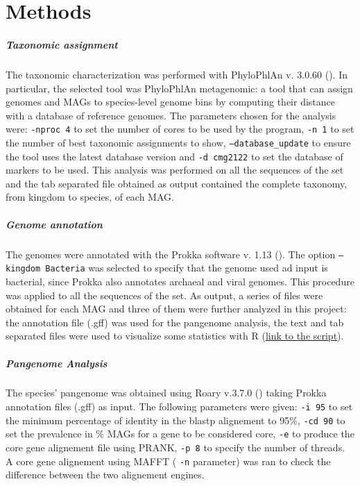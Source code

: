 \section*{Methods}




\nocite{Tange2011a}

\subparagraph*{Taxonomic assignment}

The taxonomic characterization was performed with PhyloPhlAn v. 3.0.60 (\cite{phylophlan}). In particular, the selected tool was PhyloPhlAn metagenomic: a tool that can assign genomes and MAGs to species-level genome bins by computing their distance with a database of reference genomes. The parameters chosen for the analysis were: \texttt{-nproc 4} to set the number of cores to be used by the program, \texttt{-n 1} to set the number of best taxonomic assignments to show, \texttt{--database\_update} to ensure the tool uses the latest database version and \texttt{-d cmg2122} to set the database of markers to be used. This analysis was performed on all the sequences of the set and the tab separated file obtained as output contained the complete taxonomy, from kingdom to species, of each MAG.

\subparagraph*{Genome annotation}

The genomes were annotated with the Prokka software v. 1.13 (\cite{prokka}). The option \texttt{--kingdom Bacteria} was selected to specify that the genome used ad input is bacterial, since Prokka also annotates archaeal and viral genomes. This procedure was applied to all the sequences of the set. As output, a series of files were obtained for each MAG and three of them were further analyzed in this project: the annotation file (.gff) was used for the pangenome analysis, the text and tab separated files were used to visualize some statistics with R (\href{https://github.com/enricofrigoli/cmg_project/blob/main/Rscript/CMG_Rscript.md}{link to the script}).


\subparagraph*{Pangenome Analysis}

The species' pangenome was obtained using Roary v.3.7.0 (\cite{Roary}) taking Prokka annotation files (.gff) as input. 
The following parameters were given: \texttt{-i 95} to set the minimum percentage of identity
in the blastp alignement to 95\%, \texttt{-cd 90} to set the prevalence in \% MAGs for a gene
to be considered core, \texttt{-e} to produce the core gene alignement file using PRANK, \texttt{-p 8} to
specify the number of threads. A core gene alignement using MAFFT ( \texttt{-n} parameter) was ran to check
the difference between the two alignement engines.

